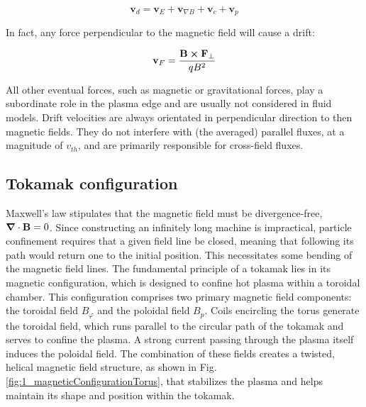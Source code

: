 \begin{equation}
	\mathbf{v}_d = \mathbf{v}_E + \mathbf{v}_{\nabla B} + \mathbf{v}_c + \mathbf{v}_p
\end{equation}

In fact, any force perpendicular to the magnetic field will cause a drift:

\begin{equation}
	\mathbf{v}_F = \frac{\mathbf{B}\cross\mathbf{F}_\perp}{qB^2}
\end{equation}

All other eventual forces, such as magnetic or gravitational forces, play a subordinate role in the plasma edge and are usually not considered in fluid models. Drift velocities are always orientated in perpendicular direction to then magnetic fields. They do not interfere with (the averaged) parallel fluxes, at a magnitude of $v_{th}$, and are primarily responsible for cross-field fluxes.





\subsection{Tokamak configuration}
\label{ssec:intro_tokamakConfiguration}
Maxwell's law stipulates that the magnetic field must be divergence-free, \(\grad\cdot\mathbf{B} = 0\). Since constructing an infinitely long machine is impractical, particle confinement requires that a given field line be closed, meaning that following its path would return one to the initial position. This necessitates some bending of the magnetic field lines. \newline
The fundamental principle of a tokamak lies in its magnetic configuration, which is designed to confine hot plasma within a toroidal chamber. This configuration comprises two primary magnetic field components: the toroidal field \( B_\varphi \) and the poloidal field \( B_p \). Coils encircling the torus generate the toroidal field, which runs parallel to the circular path of the tokamak and serves to confine the plasma. A strong current passing through the plasma itself induces the poloidal field. The combination of these fields creates a twisted, helical magnetic field structure, as shown in Fig. \ref{fig:1_magneticConfigurationTorus}, that stabilizes the plasma and helps maintain its shape and position within the tokamak.



